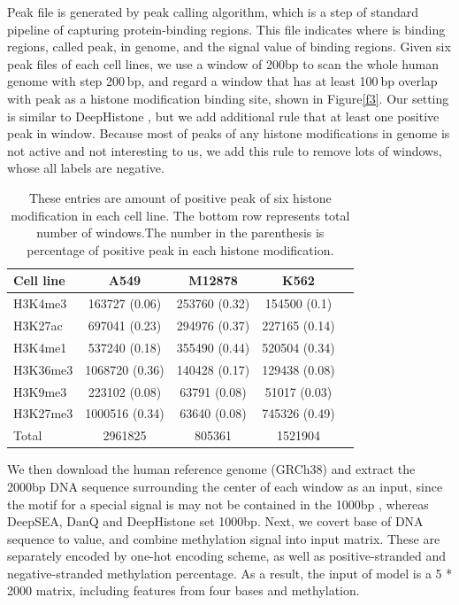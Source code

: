 Peak file is generated by peak calling algorithm, which is a step of standard pipeline of capturing protein-binding regions. This file indicates where is binding regions, called peak, in genome, and the signal value of binding regions. Given six peak files of each cell lines, we use a window of 200bp to scan the whole human genome with step 200 bp, and regard a window that has at least 100 bp overlap with peak as a histone modification binding site, shown in Figure\ref{f3}. Our setting is similar to DeepHistone \cite{yin2019deephistone}, but we add additional rule that at least one positive peak in window. Because most of peaks of any histone modifications in genome is not active and not interesting to us, we add this rule to remove lots of windows, whose all labels are negative.

\begin{table}[H]%
    \centering
    \begin{tabular}{lcccc}
    \hline
        Cell line & A549 & M12878 & K562	 \\\hline
        H3K4me3 & 163727 (0.06) & 253760 (0.32) & 154500 (0.1) \\
        H3K27ac & 697041 (0.23) & 294976 (0.37) & 227165 (0.14) \\
        H3K4me1 & 537240 (0.18) & 355490 (0.44) & 520504 (0.34) \\
        H3K36me3 & 1068720 (0.36) & 140428 (0.17) & 129438 (0.08) \\
        H3K9me3 & 223102 (0.08) & 63791 (0.08) & 51017 (0.03) \\
        H3K27me3 & 1000516 (0.34) & 63640 (0.08) & 745326 (0.49) \\\hline
        Total & 2961825 & 805361 & 1521904\\\hline
    \end{tabular}
    \captionsetup{labelfont=bf}
    \renewcommand{\baselinestretch}{1.0}
    \caption[Amount of windows of each cell line]{These entries are amount of positive peak of six histone modification in each cell line. The bottom row represents total number of windows.The number in the parenthesis is percentage of positive peak in each histone modification.}
    \label{t3}
\end{table}

We then download the human reference genome (GRCh38) and extract the 2000bp DNA sequence surrounding the center of each window as an input, since the motif for a special signal is may not be contained in the 1000bp \cite{lanchantin2020graph}, whereas DeepSEA, DanQ and DeepHistone set 1000bp. Next, we covert base of DNA sequence to value, and combine methylation signal into input matrix. These are separately encoded by one-hot encoding scheme, as well as positive-stranded and negative-stranded methylation percentage. As a result, the input of model is a 5 * 2000 matrix, including features from four bases and methylation.


